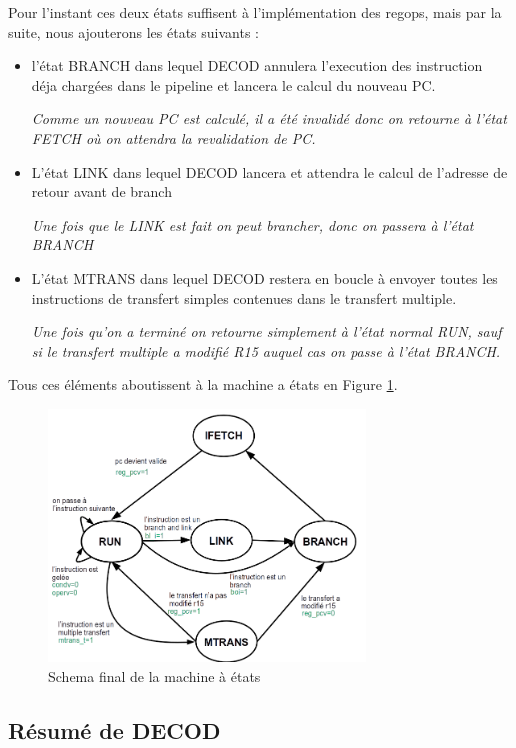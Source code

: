 \documentclass{article}
\begin{document}
Pour l'instant ces deux états suffisent à l'implémentation des regops, mais par la suite,
nous ajouterons les états suivants :
\begin{itemize}
 \item l'état BRANCH dans lequel DECOD annulera l'execution des instruction déja chargées dans le pipeline
       et lancera le calcul du nouveau PC.

       \textit{Comme un nouveau PC est calculé, il a été invalidé donc on retourne à l'état FETCH où on attendra
       la revalidation de PC.}
 \item L'état LINK dans lequel DECOD lancera et attendra le calcul de l'adresse de retour avant de branch

       \textit{Une fois que le LINK est fait on peut brancher, donc on passera à l'état BRANCH}
 \item L'état MTRANS dans lequel DECOD restera en boucle à envoyer toutes les instructions de transfert simples
       contenues dans le transfert multiple.

       \textit{Une fois qu'on a terminé on retourne simplement à l'état normal RUN, sauf si le transfert multiple a
       modifié R15 auquel cas on passe à l'état BRANCH.}
\end{itemize}

Tous ces éléments aboutissent à la machine a états en Figure \ref{mae}.

\begin{figure}[H]
\includegraphics[width=0.75\textwidth]{pics/mae.png}
\centering
\caption{Schema final de la machine à états}
\label{mae}
\end{figure}

\subsection{Résumé de DECOD}
\end{document}
